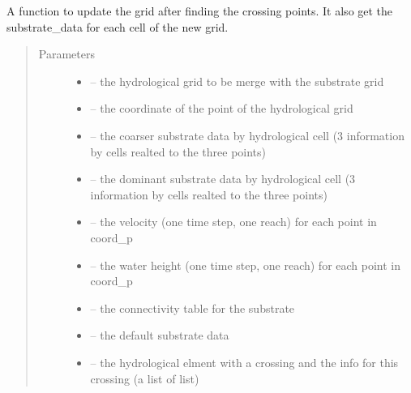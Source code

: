 \documentclass[letterpaper,10pt,english]{sphinxmanual}
\begin{document}
\begin{fulllineitems}
\label{\detokenize{index:src.mesh_grid2.create_merge_grid}}
A function to update the grid after finding the crossing points. It also get the substrate\_data for each cell
of the new grid.
\begin{quote}\begin{description}
\item[{Parameters}] \leavevmode\begin{itemize}
\item {} 
 -- the hydrological grid to be merge with the substrate grid

\item {} 
 -- the coordinate of the point of the hydrological grid

\item {} 
 -- the coarser substrate data by hydrological cell (3 information by cells realted to
the three points)

\item {} 
 -- the dominant substrate data by hydrological cell (3 information by cells realted to
the three points)

\item {} 
 -- the velocity (one time step, one reach) for each point in coord\_p

\item {} 
 -- the water height (one time step, one reach) for each point in coord\_p

\item {} 
 -- the connectivity table for the substrate

\item {} 
 -- the default substrate data

\item {} 
 -- the hydrological elment with a crossing and the info for this crossing (a list of list)

\end{itemize}


\end{description}
\end{quote}
\end{fulllineitems}
\end{document}
